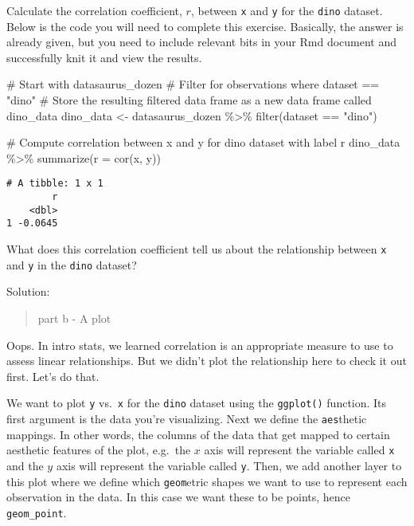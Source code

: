 \documentclass[
  letterpaper,
  DIV=11,
  numbers=noendperiod]{scrartcl}
\newenvironment{Shaded}{\begin{snugshade}}{\end{snugshade}}
\newcommand{\AttributeTok}[1]{\textcolor[rgb]{0.40,0.45,0.13}{#1}}
\newcommand{\CommentTok}[1]{\textcolor[rgb]{0.37,0.37,0.37}{#1}}
\newcommand{\FunctionTok}[1]{\textcolor[rgb]{0.28,0.35,0.67}{#1}}
\newcommand{\NormalTok}[1]{\textcolor[rgb]{0.00,0.23,0.31}{#1}}
\newcommand{\OtherTok}[1]{\textcolor[rgb]{0.00,0.23,0.31}{#1}}
\newcommand{\SpecialCharTok}[1]{\textcolor[rgb]{0.37,0.37,0.37}{#1}}
\newcommand{\StringTok}[1]{\textcolor[rgb]{0.13,0.47,0.30}{#1}}
\begin{document}
Calculate the correlation coefficient, \(r\), between \texttt{x} and
\texttt{y} for the \texttt{dino} dataset. Below is the code you will
need to complete this exercise. Basically, the answer is already given,
but you need to include relevant bits in your Rmd document and
successfully knit it and view the results.

\begin{Shaded}
\begin{Highlighting}[]
\CommentTok{\# Start with \textasciigrave{}datasaurus\_dozen\textasciigrave{}}
\CommentTok{\# Filter for observations where \textasciigrave{}dataset == "dino"\textasciigrave{}}
\CommentTok{\# Store the resulting filtered data frame as a new data frame called \textasciigrave{}dino\_data\textasciigrave{}}
\NormalTok{dino\_data }\OtherTok{\textless{}{-}}\NormalTok{ datasaurus\_dozen }\SpecialCharTok{\%\textgreater{}\%}
  \FunctionTok{filter}\NormalTok{(dataset }\SpecialCharTok{==} \StringTok{"dino"}\NormalTok{)}

\CommentTok{\# Compute correlation between \textasciigrave{}x\textasciigrave{} and \textasciigrave{}y\textasciigrave{} for \textasciigrave{}dino\textasciigrave{} dataset with label \textasciigrave{}r\textasciigrave{}}
\NormalTok{dino\_data }\SpecialCharTok{\%\textgreater{}\%}
  \FunctionTok{summarize}\NormalTok{(}\AttributeTok{r =} \FunctionTok{cor}\NormalTok{(x, y))}
\end{Highlighting}
\end{Shaded}

\begin{verbatim}
# A tibble: 1 x 1
        r
    <dbl>
1 -0.0645
\end{verbatim}

What does this correlation coefficient tell us about the relationship
between \texttt{x} and \texttt{y} in the \texttt{dino} dataset?

Solution:

\begin{quote}
part b - A plot
\end{quote}

Oops. In intro stats, we learned correlation is an appropriate measure
to use to assess linear relationships. But we didn't plot the
relationship here to check it out first. Let's do that.

We want to plot \texttt{y} vs.~\texttt{x} for the \texttt{dino} dataset
using the \texttt{ggplot()} function. Its first argument is the data
you're visualizing. Next we define the \texttt{aes}thetic mappings. In
other words, the columns of the data that get mapped to certain
aesthetic features of the plot, e.g.~the \(x\) axis will represent the
variable called \texttt{x} and the \(y\) axis will represent the
variable called \texttt{y}. Then, we add another layer to this plot
where we define which \texttt{geom}etric shapes we want to use to
represent each observation in the data. In this case we want these to be
points, hence \texttt{geom\_point}.
\end{document}
